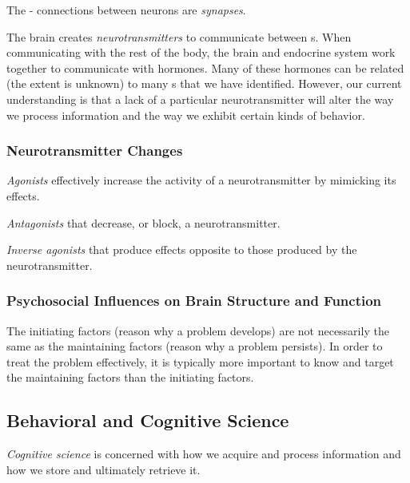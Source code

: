 \begin{definition}[Synapse]\label{def:Synapse}
  The - connections between neurons are \emph{synapses}.
\end{definition}

The brain creates \emph{neurotransmitters} to communicate between s.
When communicating with the rest of the body, the brain and endocrine system work together to communicate with hormones.
Many of these hormones can be related (the extent is unknown) to many s that we have identified.
However, our current understanding is that a lack of a particular neurotransmitter will alter the way we process information and the way we exhibit certain kinds of behavior.

\subsubsection{Neurotransmitter Changes}\label{subsubsec:Neurotransmitter_Changes}
\begin{definition}[Agonist]\label{def:Agonist}
  \emph{Agonists} effectively increase the activity of a neurotransmitter by mimicking its effects.
\end{definition}

\begin{definition}[Antagonist]\label{def:Agonist}
  \emph{Antagonists} that decrease, or block, a neurotransmitter.
\end{definition}

\begin{definition}\label{def:Inverse_Agonist}
  \emph{Inverse agonists} that produce effects opposite to those produced by the neurotransmitter.
\end{definition}

\subsubsection{Psychosocial Influences on Brain Structure and Function}\label{subsubsec:Psychosocial_Influences_Brain_Structure_Function}
The initiating factors (reason why a problem develops) are not necessarily the same as the maintaining factors (reason why a problem persists).
In order to treat the problem effectively, it is typically more important to know and target the maintaining factors than the initiating factors.

\subsection{Behavioral and Cognitive Science}\label{subsec:Behavioral_Cognitive_Science}
\begin{definition}\label{def:Cognitive_Science}
  \emph{Cognitive science} is concerned with how we acquire and process information and how we store and ultimately retrieve it.
\end{definition}

